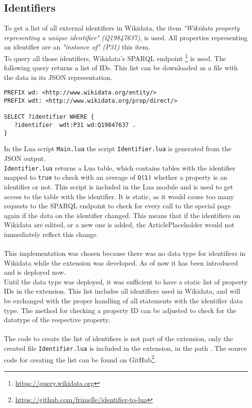 \subsection{Identifiers}

To get a list of all external identifiers in Wikidata, the item \textit{"Wikidata property representing a unique identifier" (Q19847637)}, is used. All properties representing an identifier are an \textit{"instance of" (P31)} this item. \\
To query all those identifiers, Wikidata's SPARQL endpoint \footnote{\href{https://query.wikidata.org}{https://query.wikidata.org}} is used. The following query returns a list of IDs. This list can be downloaded as a file with the data in its JSON representation. \\

\begin{lstlisting}[frame=single] 
PREFIX wd: <http://www.wikidata.org/entity/>
PREFIX wdt: <http://www.wikidata.org/prop/direct/>

SELECT ?identifier WHERE {
   ?identifier  wdt:P31 wd:Q19847637 . 
}
\end{lstlisting}

In the Lua script \texttt{\justify Main.lua} the script \texttt{\justify Identifier.lua} is generated from the JSON output. \\  \texttt{\justify Identifier.lua} returns a Lua table, which contains tables with the identifier mapped to \texttt{true} to check with an average of \texttt{\justify O(1)} whether a property is an identifier or not. This script is included in the Lua module and is used to get access to the table with the identifier. It is static, as it would cause too many requests to the SPARQL endpoint to check for every call to the special page again if the data on the identifier changed. This means that if the identifiers on Wikidata are edited, or a new one is added, the ArticlePlaceholder would not immediately reflect this change. \\
\\
This implementation was chosen because there was no data type for identifiers in Wikidata while the extension was developed. As of now it has been introduced and is deployed now. \\
Until the data type was deployed, it was sufficient to have a static list of property IDs in the extension. This list includes all identifiers used in Wikidata, and will be exchanged with the proper handling of all statements with the identifier data type. The method for checking a property ID can be adjusted to check for the datatype of the respective property. \\
\\
The code to create the list of identifiers is not part of the extension, only the created file \texttt{\justify Identifier.lua} is included in the extension, in the path . The source code for creating the list can be found on GitHub\footnote{\href{https://github.com/frimelle/identifier-to-lua}{https://github.com/frimelle/identifier-to-lua}}. 
